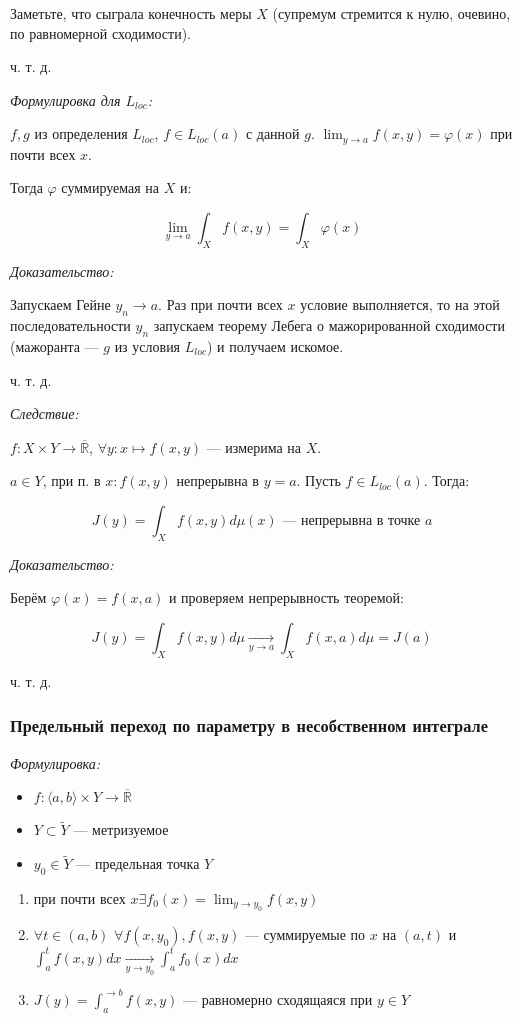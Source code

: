 \documentclass{article}
\def\dbl{\,\,}
\def\rinf{\overline{\mathbb{R}}}
\def\goesto#1{\underset{#1}{\longrightarrow}}
\begin{document}
Заметьте, что сыграла конечность меры $X$ (супремум стремится к нулю, очевино, по равномерной сходимости).

ч. т. д. 

\textit{Формулировка для $L_{loc}$:}

$f, g$ из определения $L_{loc}$, $f \in L_{loc}(a)$ с данной $g$. $\lim_{y \rightarrow a} f(x, y) = \varphi(x)$ при почти всех $x$.

Тогда $\varphi$ суммируемая на $X$ и:

\[\lim_{y \rightarrow a} \int_{X} f(x, y) = \int_{X} \varphi(x)\]

\textit{Доказательство:}

Запускаем Гейне $y_n \rightarrow a$. Раз при почти всех $x$ условие выполняется, то на этой последовательности $y_n$ запускаем теорему Лебега о мажорированной сходимости (мажоранта --- $g$ из условия $L_{loc}$) и получаем искомое.

ч. т. д.

\textit{Следствие:}

$f: X \times Y \rightarrow \rinf$, $\forall y: x \mapsto f(x, y)$ --- измерима на $X$.

$a \in Y$, при п. в $x: f(x, y)$ непрерывна в $y = a$. Пусть $f \in L_{loc}(a)$. Тогда:


\[J(y) = \int_{X} f(x, y) d\mu(x) \text{ --- непрерывна в точке } a\]

\textit{Доказательство: }

Берём $\varphi(x) = f(x, a)$ и проверяем непрерывность теоремой:

\[J(y) = \int_{X} f(x, y) d\mu \goesto{y \rightarrow a} \int_{X} f(x, a) d\mu = J(a)\]

ч. т. д. 

\subsubsection{Предельный переход по параметру в несобственном интеграле}
\textit{Формулировка:}

\begin{itemize}
    \item $f: \langle a, b \rangle \times Y \rightarrow \rinf$
    \item $Y \subset \tilde{Y}$ --- метризуемое
    \item $y_0 \in \tilde{Y}$ --- предельная точка $Y$
\end{itemize}

\begin{enumerate}
    \item при почти всех $x \exists f_0(x) = \lim_{y \rightarrow y_0} f(x, y)$
    \item $\forall t \in (a, b) \dbl \forall f(x, y_0), f(x, y)$ --- суммируемые по $x$ на $(a, t)$ и $\int_a^{t} f(x, y) dx \goesto{y \rightarrow y_0} \int_a^{t} f_0(x) dx$
    \item $J(y) = \int_a^{\rightarrow b} f(x, y)$ --- равномерно сходящаяся при $y \in Y$
\end{enumerate}
\end{document}
